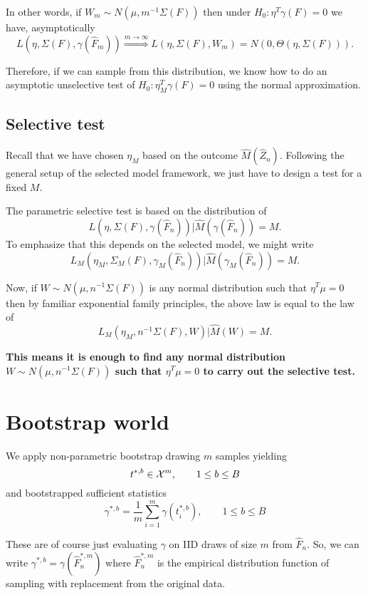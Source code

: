 \documentclass{article}
\begin{document}
In other words, if $W_m \sim N(\mu, m^{-1}\Sigma(F))$ 
then under $H_0: \eta^T\gamma(F)=0$ we have, asymptotically
$$
 L(\eta, \Sigma(F), \gamma(\hat{F}_m))  \overset{m \rightarrow \infty}{\Rightarrow} L(\eta, \Sigma(F), W_m) = N(0,  \Theta(\eta, \Sigma(F))).
$$

Therefore, if we can
sample from this distribution, we know how to
do an asymptotic unselective test of $H_0:\eta_M^T\gamma(F)=0$ using the 
normal approximation.


\subsection{Selective test}
\label{sec:selective}

Recall that we have chosen $\eta_M$ based on the outcome $\hat{M}(\hat{Z}_n)$. Following the general setup of the
selected model framework, we just have to design
a test for a fixed $M$.

The parametric selective test is based on the distribution of 
$$
L(\eta, \Sigma(F), \gamma(\hat{F}_n)) \big \vert \hat{M}(\gamma(\hat{F}_n)) = M.
$$
To emphasize that this depends on the selected model, we might write
$$
L_M(\eta_M, \Sigma_M(F), \gamma_M(\hat{F}_n)) \big \vert \hat{M}(\gamma_M(\hat{F}_n)) = M.
$$

Now, if $W \sim N(\mu, n^{-1}\Sigma(F))$ is any normal distribution
such that $\eta^T\mu=0$ then by familiar exponential family principles, the above law
is equal to the law of
$$
L_M(\eta_M, n^{-1}\Sigma(F), W) \big \vert \hat{M}(W) = M.
$$

{\bf This means it is enough to find any normal distribution
$W \sim N(\mu, n^{-1}\Sigma(F))$ such that $\eta^T\mu=0$ to carry out the
selective test.
}

\section{Bootstrap world}

We apply non-parametric bootstrap drawing $m$ samples
yielding 
$$
t^{*,b} \in {\cal X}^m, \qquad 1 \leq  b \leq B
$$
and  bootstrapped sufficient statistics
$$
\gamma^{*,b} = \frac{1}{m} \sum_{i=1}^m \gamma(t_i^{*,b}),  \qquad 1 \leq  b \leq B
$$

These are of course just evaluating $\gamma$ on 
IID draws of size $m$ from $\hat{F}_n$. So,
we can write
$\gamma^{*,b} = \gamma(\hat{F}_n^{*,m})$
where $\hat{F}_n^{*,m}$ is the empirical
distribution function of sampling with replacement from the original data.
\end{document}
